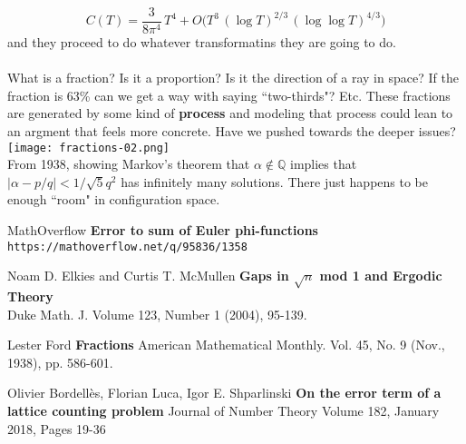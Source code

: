\documentclass[12pt]{article}
\begin{document}
$$ C(T) = \frac{3}{8 \pi^4 }\, T^4 + O\big(T^3 \, (\log T)^{2/3} \,(\log \log T)^{4/3} \big) $$ 
and they proceed to do whatever transformatins they are going to do.  \\ \\
What is a fraction?   Is it a proportion? Is it the direction of a ray in space?  If the fraction is 63\% can we get a way with saying ``two-thirds"?  Etc.  These fractions are generated by some kind of \textbf{process} and modeling that process could lean to an argment that feels more concrete. Have we pushed towards the deeper issues?\\
\texttt{[image: fractions-02.png]} \\
From 1938, showing Markov's theorem that $\alpha \notin \mathbb{Q}$ implies that $|\alpha - p/q| < 1/\sqrt{5}q^2 $ has infinitely many solutions.  There just happens to be enough ``room" in configuration space.

\vfill

\begin{thebibliography}{}

\item MathOverflow \textbf{Error to sum of Euler phi-functions} \texttt{https://mathoverflow.net/q/95836/1358}

\item Noam D. Elkies and Curtis T. McMullen \textbf{Gaps in $\sqrt{n}$ mod 1 and Ergodic Theory} \\ Duke Math. J. Volume 123, Number 1 (2004), 95-139.

\item Lester Ford \textbf{Fractions} American Mathematical Monthly. Vol. 45, No. 9 (Nov., 1938), pp. 586-601. 

\item Olivier Bordell\`{e}s, Florian Luca, Igor E. Shparlinski \textbf{On the error term of a lattice counting problem} Journal of Number Theory Volume 182, January 2018, Pages 19-36
\end{thebibliography} 
\end{document}
